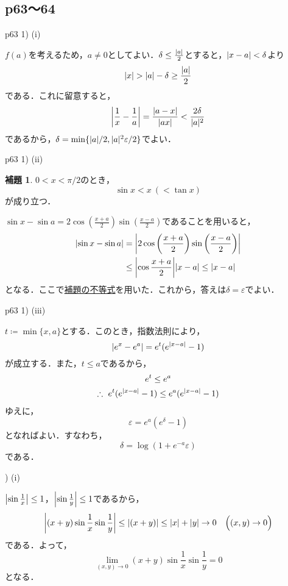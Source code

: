 \documentclass[dvipdfmx,uplatex,11pt]{jsarticle}
\DeclarePairedDelimiter\abs{\lvert}{\rvert}
\theoremstyle{definition}
\newtheorem{lemm}{補題}[section]
\begin{document}
\subsection{p63～64}
p63 1) (i)
\begin{leftbar}
    $f(a)$を考えるため，$a \ne 0$としてよい．$\delta \le \frac{\abs{a}}{2}$とすると，$\abs{x-a}<\delta$より
    \[
       \abs{x} > \abs{a}-\delta \ge \frac{\abs{a}}{2}
    \]
    である．これに留意すると，
    \[
        \abs*{\frac{1}{x}-\frac{1}{a}}=\frac{\abs{a-x}}{\abs{ax}} <\frac{2 \delta}{\abs{a}^2}
    \]
    であるから，$\delta = \min \{ \abs{a}/2,\abs{a}^2\varepsilon/2 \}$でよい．
\end{leftbar}
p63 1) (ii)
\begin{lemm}
    \label{lem:三角関数の不等式}
    $0 < x < \pi /2$のとき，
    \[
        \sin x < x ~(< \tan x )
    \]
    が成り立つ．
\end{lemm}

\begin{leftbar}
    $\sin x - \sin a = 2 \cos \left( \frac{x+a}{2} \right )\sin \left ( \frac{x-a}{2} \right)$であることを用いると，
    \begin{align*}
        \abs{\sin x - \sin a}&= \abs*{2 \cos \left( \frac{x+a}{2} \right )\sin \left ( \frac{x-a}{2} \right)} \\
        & \le  \abs*{\cos \frac{x+a}{2}} \abs{x-a} \le \abs{x-a}
    \end{align*}
    となる．ここで\hyperref[lem:三角関数の不等式]{補題の不等式}を用いた．これから，答えは$\delta = \varepsilon$でよい．
\end{leftbar}

p63 1) (iii)
\begin{leftbar}
    $t \coloneqq \min \{x,a\}$とする．このとき，指数法則により，
    \[
        \abs{e^x-e^a}=e^t (e^{\abs{x-a}}-1)
    \]
    が成立する．また，$t \le a$であるから，
    \begin{gather*}
        e^t \le e^a \\
        \therefore ~ e^t(e^{\abs{x-a}}-1) \le e^a(e^{\abs{x-a}}-1)
    \end{gather*}
    ゆえに，
    \[
        \varepsilon = e^a (e^\delta -1)
    \]
    となればよい．すなわち，
    \[
        \delta = \log (1+e^{-a}\varepsilon)
    \]
    である．
\end{leftbar}

) (i)
\begin{leftbar}
    $\abs*{\sin \frac{1}{x}} \le 1$，$\abs*{\sin \frac{1}{y}} \le 1$であるから，
    \[
        \abs*{(x+y) \sin \frac{1}{x} \sin \frac{1}{y}} \le \abs{(x+y)} \le \abs{x}+\abs{y} \to 0 \quad  \Bigl( (x,y) \to 0 \Bigl)
    \]
    である．よって，
    \[
        \lim_{(x,y)\to 0} (x+y) \sin \frac{1}{x} \sin \frac{1}{y} =0
    \]
    となる．
\end{leftbar}
\end{document}

